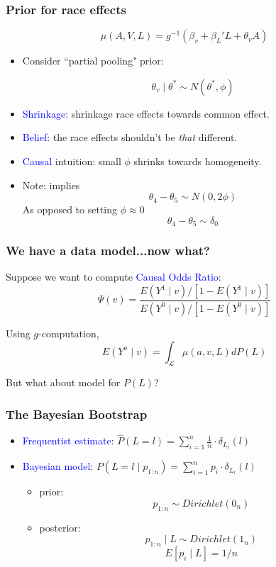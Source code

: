 \documentclass[xcolor=x11names,compress]{beamer}
\renewcommand{\(}{\begin{columns}}
\renewcommand{\)}{\end{columns}}
\newcommand{\<}[1]{\begin{column}{#1}}
\renewcommand{\>}{\end{column}}
\begin{document}
\begin{frame}
	\frametitle{Prior for race effects}
	$$ \mu(A, V, L) = g^{-1}( \beta_v + \beta_L' L +  \theta_v A ) $$
	
	\begin{itemize}
	\item Consider ``partial pooling" prior: 
	 
	$$ \theta_v \mid \theta^* \sim N(\theta^*, \phi)  $$
	\item \textcolor{blue}{Shrinkage}: shrinkage race effects towards common effect. 
	\item \textcolor{blue}{Belief}: the race effects shouldn't be \textit{that} different. 
	\item \textcolor{blue}{Causal} intuition: small $\phi$ shrinks towards homogeneity.
	 
	\item Note: implies 
	$$\theta_4 - \theta_5 \sim N(0, 2\phi )$$
	As opposed to setting $\phi \approx 0$
	$$ \theta_4 - \theta_5 \sim \delta_0 $$
	\end{itemize}	
\end{frame}

\begin{frame}
	\frametitle{We have a data model...now what?}
	
	Suppose we want to compute \textcolor{blue}{Causal Odds Ratio}:
	$$ \Psi(v) = \frac{ E(Y^1 \mid v)/[1-E(Y^1 \mid v)] }{E(Y^0 \mid v)/[1-E(Y^0 \mid v)] } $$
	 
	Using $g$-computation, 
	$$ E(Y^a \mid v ) = \int_{\mathcal{L}} \mu(a, v, L) dP(L) $$
	
	But what about model for $P(L)$?
\end{frame}

\begin{frame}
	\frametitle{The Bayesian Bootstrap}
	
	\begin{itemize}
	 \item  \textcolor{blue}{Frequentist estimate}: $\hat P(L=l) = \sum_{i=1}^n \frac{1}{n} \cdot \delta_{L_i} (l)$
	  
	 \item \textcolor{blue}{Bayesian model}: $P(L=l \mid p_{1:n}) = \sum_{i=1}^n p_i \cdot \delta_{L_i} (l)$
	  
	 \begin{itemize}
	 	\item prior: 
		$$p_{1:n} \sim Dirichlet(0_n)$$
		 
		\item posterior: 
		$$p_{1:n} \mid L \sim Dirichlet(1_n)$$
		$$E[p_i \mid L] = 1/n $$
	 \end{itemize}
	\end{itemize}	
\end{frame}
\end{document}
